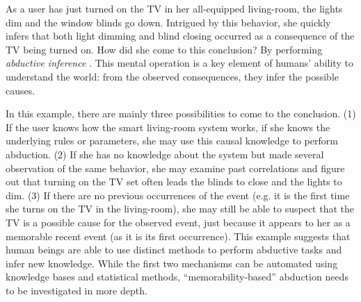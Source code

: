 \documentclass[conference]{IEEEtran}
\begin{document}
As a user has just turned on the TV in her all-equipped living-room, the
lights dim and the window blinds go down. Intrigued by this behavior, she
quickly infers that both light dimming and blind closing occurred as a
consequence of the TV being turned on. How did she come to this conclusion?
By performing \emph{abductive inference} \cite{magnani_abduction_2011}. This mental operation
is a key element of humans' ability to understand the world: from the
observed consequences, they infer the possible causes.

In this example, there are mainly three possibilities to come to the
conclusion. (1) If the user knows how the smart living-room system works, if she
knows the underlying rules or parameters, she may use this causal
knowledge to perform abduction. (2) If she has no knowledge
about the system but made several observation of the same behavior, she may examine past
correlations and figure out that turning on the TV set often leads the blinds to
close and the lights to dim. (3) If there are no previous occurrences of the event (e.g. it is the first time she turns on the TV
in the living-room), she may still be able to
suspect that the TV is a possible cause for the observed event, just because it appears to her as a memorable recent event (as it is its first occurrence). This example
suggests that human beings are able to use distinct methods to perform abductive tasks
and infer new knowledge. While the first two mechanisms can be
automated using knowledge bases and statistical methods, ``memorability-based'' abduction needs to be investigated in more depth.





\end{document}
